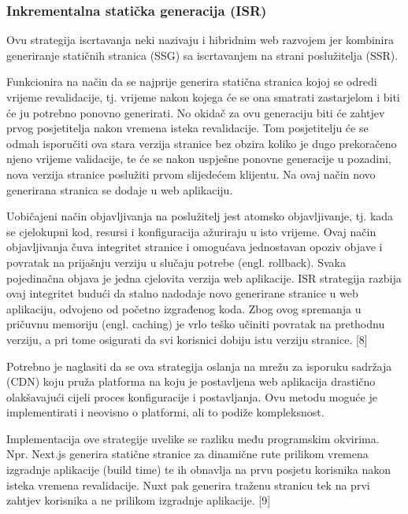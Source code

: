 \subsubsection{Inkrementalna statička generacija (ISR)}

Ovu strategija iscrtavanja neki nazivaju i hibridnim web razvojem jer kombinira generiranje statičnih stranica (SSG) sa iscrtavanjem na strani poslužitelja (SSR).

\bigskip

Funkcionira na način da se najprije generira statična stranica kojoj se odredi vrijeme revalidacije, tj. vrijeme nakon kojega će se ona smatrati zastarjelom i biti će ju potrebno ponovno  generirati. No okidač za ovu generaciju biti će zahtjev prvog posjetitelja nakon vremena isteka revalidacije. Tom posjetitelju će se odmah isporučiti ova stara verzija stranice bez obzira koliko je dugo prekoračeno njeno vrijeme validacije, te će se nakon uspješne ponovne generacije u pozadini, nova verzija stranice poslužiti prvom slijedećem klijentu. Na ovaj način novo generirana stranica se dodaje u web aplikaciju.

\bigskip

Uobičajeni način objavljivanja na poslužitelj jest atomsko objavljivanje, tj. kada se cjelokupni kod, resursi i konfiguracija ažuriraju u isto vrijeme. Ovaj način objavljivanja čuva integritet stranice i omogućava jednostavan opoziv objave i povratak na prijašnju verziju u slučaju potrebe (engl. rollback). Svaka pojedinačna objava je jedna cjelovita verzija web aplikacije. ISR strategija razbija ovaj integritet budući da stalno nadodaje novo generirane stranice u web aplikaciju, odvojeno od početno izgrađenog koda. Zbog ovog spremanja u pričuvnu memoriju (engl. caching)  je vrlo teško učiniti povratak na prethodnu verziju, a pri tome osigurati da svi korisnici dobiju istu verziju stranice. [8]

\bigskip

Potrebno je naglasiti da se ova strategija oslanja na mrežu za isporuku sadržaja (CDN) koju pruža platforma na koju je postavljena web aplikacija drastično olakšavajući cijeli proces konfiguracije i postavljanja. Ovu metodu moguće je implementirati i neovisno o platformi, ali to podiže kompleksnost.

\bigskip

Implementacija ove strategije uvelike se razliku među programskim okvirima.
Npr. Next.js generira statične stranice za dinamične rute prilikom vremena izgradnje aplikacije (build time) te ih obnavlja na prvu posjetu korisnika nakon isteka vremena revalidacije. Nuxt pak generira traženu stranicu tek na prvi zahtjev korisnika a ne prilikom izgradnje aplikacije. [9]

